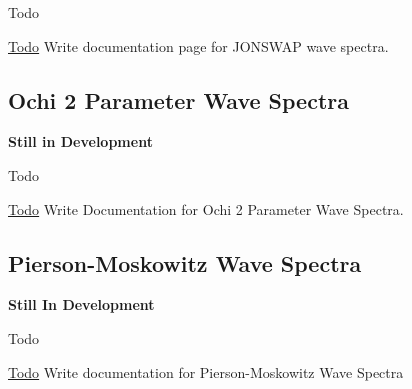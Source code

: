 \begin{DoxyRefDesc}{Todo}
\item[\hyperlink{todo__todo000033}{Todo}]Write documentation page for J\-O\-N\-S\-W\-A\-P wave spectra.\end{DoxyRefDesc}
\hypertarget{ochi-2param_spectra}{}\subsection{Ochi 2 Parameter Wave Spectra}\label{ochi-2param_spectra}
{\bfseries Still in Development}

\begin{DoxyRefDesc}{Todo}
\item[\hyperlink{todo__todo000034}{Todo}]Write Documentation for Ochi 2 Parameter Wave Spectra.\end{DoxyRefDesc}
\hypertarget{p-m_spectra}{}\subsection{Pierson-\/\-Moskowitz Wave Spectra}\label{p-m_spectra}
{\bfseries Still In Development}

\begin{DoxyRefDesc}{Todo}
\item[\hyperlink{todo__todo000035}{Todo}]Write documentation for Pierson-\/\-Moskowitz Wave Spectra\end{DoxyRefDesc}
